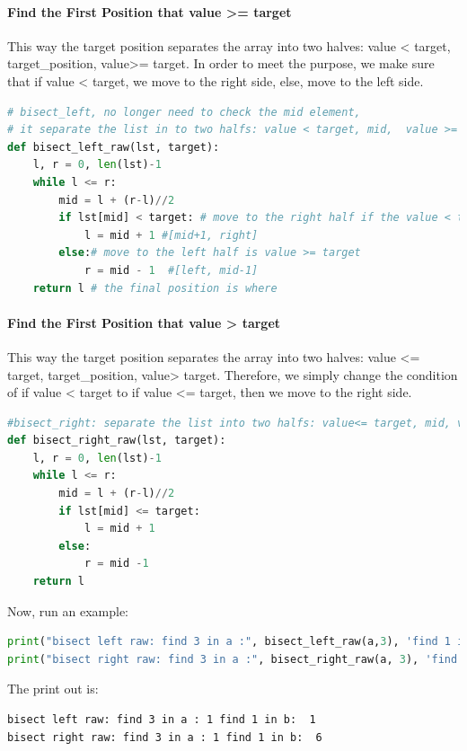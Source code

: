 \documentclass[../searching.tex]{subfiles}
\begin{document}
\paragraph{Find the First Position that value >= target} This way the target position separates the array into two halves: value < target, target\_position, value>= target. In order to meet the purpose, we make sure that if value < target, we move to the right side, else, move to the left side.
\begin{lstlisting}[language=Python]
# bisect_left, no longer need to check the mid element,
# it separate the list in to two halfs: value < target, mid,  value >= target
def bisect_left_raw(lst, target):
    l, r = 0, len(lst)-1
    while l <= r:
        mid = l + (r-l)//2
        if lst[mid] < target: # move to the right half if the value < target, till
            l = mid + 1 #[mid+1, right]
        else:# move to the left half is value >= target
            r = mid - 1  #[left, mid-1]
    return l # the final position is where
\end{lstlisting}

\paragraph{Find the First Position that value > target} This way the target position separates the array into two halves: value <= target, target\_position, value> target. Therefore, we simply change the condition of if value < target to if value <= target, then we move to the right side.
\begin{lstlisting}[language=Python]
#bisect_right: separate the list into two halfs: value<= target, mid, value > target
def bisect_right_raw(lst, target):
    l, r = 0, len(lst)-1
    while l <= r:
        mid = l + (r-l)//2
        if lst[mid] <= target:
            l = mid + 1
        else:
            r = mid -1
    return l
\end{lstlisting}
Now, run an example:
\begin{lstlisting}[language=Python]
print("bisect left raw: find 3 in a :", bisect_left_raw(a,3), 'find 1 in b: ', bisect_left_raw(b, 1))
print("bisect right raw: find 3 in a :", bisect_right_raw(a, 3), 'find 1 in b: ', bisect_right_raw(b, 1))
\end{lstlisting}
The print out is:
\begin{lstlisting}
bisect left raw: find 3 in a : 1 find 1 in b:  1
bisect right raw: find 3 in a : 1 find 1 in b:  6
\end{lstlisting}
\end{document}
